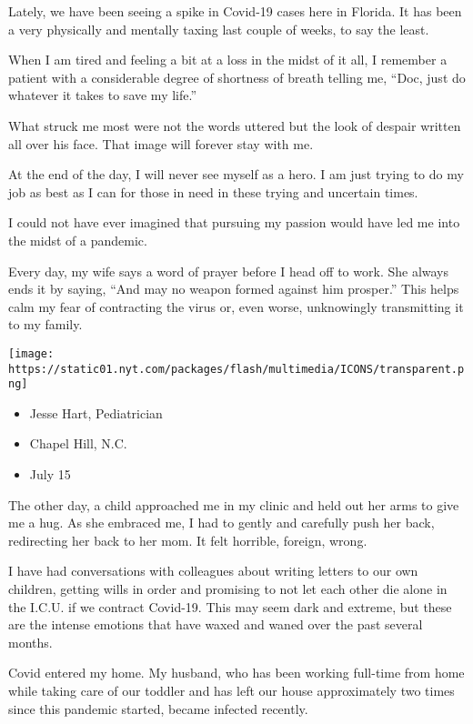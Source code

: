 Lately, we have been seeing a spike in Covid-19 cases here in Florida.
It has been a very physically and mentally taxing last couple of weeks,
to say the least.

When I am tired and feeling a bit at a loss in the midst of it all, I
remember a patient with a considerable degree of shortness of breath
telling me, ``Doc, just do whatever it takes to save my life.''

What struck me most were not the words uttered but the look of despair
written all over his face. That image will forever stay with me.

At the end of the day, I will never see myself as a hero. I am just
trying to do my job as best as I can for those in need in these trying
and uncertain times.

I could not have ever imagined that pursuing my passion would have led
me into the midst of a pandemic.

Every day, my wife says a word of prayer before I head off to work. She
always ends it by saying, ``And may no weapon formed against him
prosper.'' This helps calm my fear of contracting the virus or, even
worse, unknowingly transmitting it to my family.

\texttt{[image: https://static01.nyt.com/packages/flash/multimedia/ICONS/transparent.png]}

\begin{itemize}
\tightlist
\item
  Jesse Hart, Pediatrician
\item
  Chapel Hill, N.C.
\item
  July 15
\end{itemize}

The other day, a child approached me in my clinic and held out her arms
to give me a hug. As she embraced me, I had to gently and carefully push
her back, redirecting her back to her mom. It felt horrible, foreign,
wrong.

I have had conversations with colleagues about writing letters to our
own children, getting wills in order and promising to not let each other
die alone in the I.C.U. if we contract Covid-19. This may seem dark and
extreme, but these are the intense emotions that have waxed and waned
over the past several months.

Covid entered my home. My husband, who has been working full-time from
home while taking care of our toddler and has left our house
approximately two times since this pandemic started, became infected
recently.

